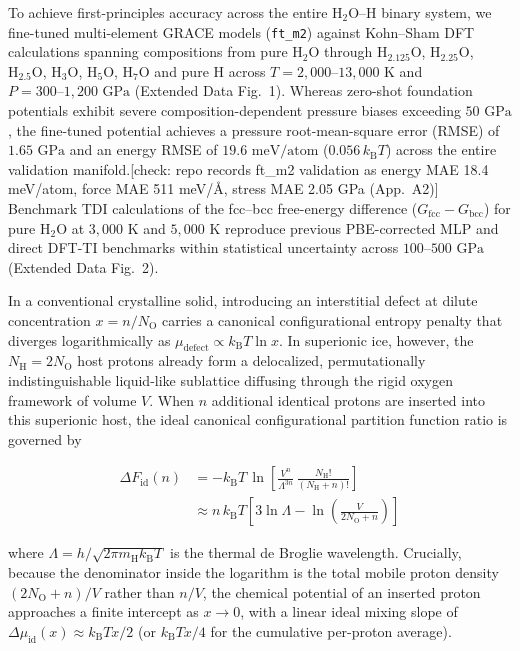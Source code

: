 \documentclass[twocolumn,secnumarabic,amssymb,nobibnotes,aps,prl,superscriptaddress,10pt]{revtex4-2}
\newcommand{\note}[1]{{\color{red}\small[#1]}}
\begin{document}
To achieve first-principles accuracy across the entire $\text{H}_2\text{O}\text{--H}$ binary system, we fine-tuned multi-element GRACE models (\texttt{ft\_m2}) against Kohn--Sham DFT calculations spanning compositions from pure $\text{H}_2\text{O}$ through $\text{H}_{2.125}\text{O}$, $\text{H}_{2.25}\text{O}$, $\text{H}_{2.5}\text{O}$, $\text{H}_3\text{O}$, $\text{H}_5\text{O}$, $\text{H}_7\text{O}$ and pure $\text{H}$ across $T = 2,000\text{--}13,000\text{ K}$ and $P = 300\text{--}1,200\text{ GPa}$ (Extended Data Fig.~1). Whereas zero-shot foundation potentials exhibit severe composition-dependent pressure biases exceeding $50\text{ GPa}$, the fine-tuned potential achieves a pressure root-mean-square error (RMSE) of $1.65\text{ GPa}$ and an energy RMSE of $19.6\text{ meV/atom}$ ($0.056\,k_{\text{B}}T$) across the entire validation manifold.\note{check: repo records ft\_m2 validation as energy MAE 18.4 meV/atom, force MAE 511 meV/\AA, stress MAE 2.05 GPa (App.~A2)} Benchmark TDI calculations of the fcc--bcc free-energy difference ($G_{\text{fcc}} - G_{\text{bcc}}$) for pure $\text{H}_2\text{O}$ at $3,000\text{ K}$ and $5,000\text{ K}$ reproduce previous PBE-corrected MLP and direct DFT-TI benchmarks\cite{Wilson2013,Cheng2021} within statistical uncertainty across $100\text{--}500\text{ GPa}$ (Extended Data Fig.~2).

In a conventional crystalline solid, introducing an interstitial defect at dilute concentration $x = n / N_{\text{O}}$ carries a canonical configurational entropy penalty that diverges logarithmically as $\mu_{\text{defect}} \propto k_{\text{B}}T \ln x$. In superionic ice, however, the $N_{\text{H}} = 2N_{\text{O}}$ host protons already form a delocalized, permutationally indistinguishable liquid-like sublattice diffusing through the rigid oxygen framework of volume $V$. When $n$ additional identical protons are inserted into this superionic host, the ideal canonical configurational partition function ratio is governed by

\begin{align}
\Delta F_{\mathrm{id}}(n) &= -k_{\mathrm{B}}T\,\ln\left[\frac{V^{n}}{\Lambda^{3n}}\,\frac{N_{\mathrm{H}}!}{(N_{\mathrm{H}}+n)!}\right]\nonumber\\
&\approx n\,k_{\mathrm{B}}T\left[3\ln\Lambda-\ln\left(\frac{V}{2N_{\mathrm{O}}+n}\right)\right]
\label{eq:placement}
\end{align}

where $\Lambda = h / \sqrt{2\pi m_{\text{H}} k_{\text{B}} T}$ is the thermal de Broglie wavelength. Crucially, because the denominator inside the logarithm is the total mobile proton density $(2N_{\text{O}} + n)/V$ rather than $n/V$, the chemical potential of an inserted proton approaches a finite intercept as $x \to 0$, with a linear ideal mixing slope of $\Delta \mu_{\text{id}}(x) \approx k_{\text{B}}T x / 2$ (or $k_{\text{B}}T x / 4$ for the cumulative per-proton average).
\end{document}
